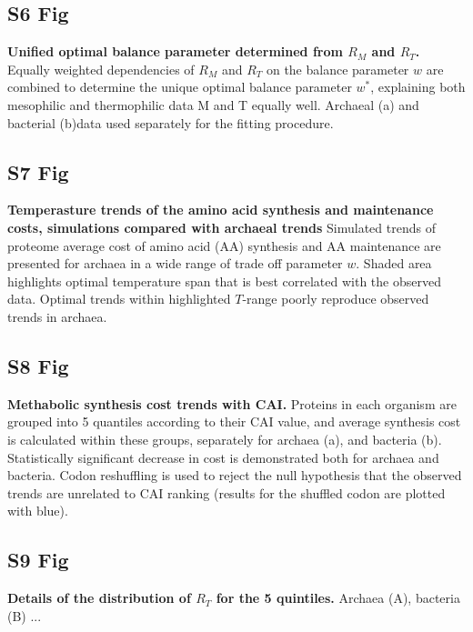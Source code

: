 \documentclass[10pt,letterpaper]{article}
\begin{document}
\subsection*{S6 Fig}
\label{fig:s6}
{\bf Unified optimal balance parameter determined from $R_M$ and $R_T$.}
Equally weighted dependencies of $R_M$ and $R_T$ on the balance parameter $w$ are combined to determine the unique optimal balance parameter $w^*$, explaining both mesophilic and thermophilic data M and T equally well. Archaeal (a) and bacterial (b)data used separately for the fitting procedure.


\subsection*{S7 Fig}
\label{fig:s7}
{\bf Temperasture trends of the amino acid synthesis and maintenance costs, simulations compared with archaeal trends}
Simulated trends of proteome average cost of amino acid (AA) synthesis and AA maintenance are presented for archaea in a wide range of trade off parameter $w$. Shaded area highlights optimal temperature span that is best correlated with the observed data. Optimal trends within highlighted $T$-range poorly reproduce observed trends in archaea.


\subsection*{S8 Fig}
\label{fig:s8}
{\bf Methabolic synthesis cost trends with CAI.}
Proteins in each organism are grouped into 5 quantiles according to their CAI value, and average synthesis cost is calculated within these groups, separately for archaea (a), and bacteria (b). Statistically significant decrease in cost is demonstrated both for archaea and bacteria. Codon reshuffling is used to reject the null hypothesis that the observed trends are unrelated to CAI ranking (results for the shuffled codon are plotted with blue).

\subsection*{S9 Fig}
\label{fig:s9}
{\bf Details of the distribution of $R_T$ for the 5 quintiles.}
Archaea (A), bacteria (B) ...
\end{document}
